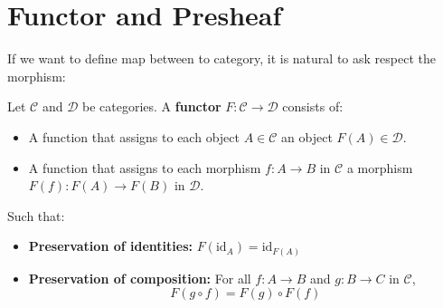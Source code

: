 \section{Functor and Presheaf}
If we want to define map between to category, it is natural to ask respect the morphism:

\begin{definition}[Functor]
  Let $\mathcal{C}$ and $\mathcal{D}$ be categories. A \textbf{functor} $F: \mathcal{C} \to \mathcal{D}$ consists of:

\begin{itemize}
    \item A function that assigns to each object $A \in \mathcal{C}$ an object $F(A) \in \mathcal{D}$.
    \item A function that assigns to each morphism $f: A \to B$ in $\mathcal{C}$ a morphism $F(f): F(A) \to F(B)$ in $\mathcal{D}$.
\end{itemize}

Such that:
\begin{itemize}
    \item \textbf{Preservation of identities:} $F(\mathrm{id}_A) = \mathrm{id}_{F(A)}$
    \item \textbf{Preservation of composition:} For all $f: A \to B$ and $g: B \to C$ in $\mathcal{C}$,
    \[
    F(g \circ f) = F(g) \circ F(f)
    \]
\end{itemize}
\end{definition}

